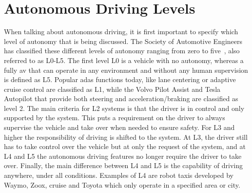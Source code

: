 
\section{Autonomous Driving Levels}
\label{sec:intro_ad}
When talking about autonomous driving, it is first important to specify which level of autonomy that is being discussed. The Society of Automotive Engineers has classified these different levels of autonomy ranging from zero to five~\cite{SAE2021}, also referred to as L0-L5. The first level L0 is a vehicle with no autonomy, whereas a fully \gls{av} that can operate in any environment and without any human supervision is defined as L5. Popular \gls{adas} functions today, like lane centering or adaptive cruise control are classified as L1, while the Volvo Pilot Assist and Tesla Autopilot that provide both steering and acceleration/braking are classified as level 2. The main criteria for L2 systems is that the driver is in control and only supported by the system. This puts a requirement on the driver to always supervise the vehicle and take over when needed to ensure safety. For L3 and higher the responsibility of driving is shifted to the system. At L3, the driver still has to take control over the vehicle but at only the request of the system, and at L4 and L5 the autonomous driving features no longer require the driver to take over. Finally, the main difference between L4 and L5 is the capability of driving anywhere, under all conditions. Examples of L4 are robot taxis developed by Waymo, Zoox, cruise and Toyota which only operate in a specified area or city. 

